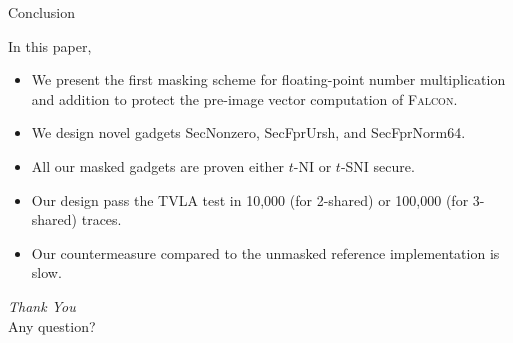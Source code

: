 \begin{frame}{Conclusion}

In this paper,
\pause
\begin{itemize}
	\item We present the first masking scheme for floating-point number multiplication and addition to protect the pre-image vector computation of \textsc{Falcon}.
	\pause
	\item We design novel gadgets {\sf SecNonzero}, {\sf SecFprUrsh}, and {\sf SecFprNorm64}.
	\pause
	\item All our masked gadgets are proven either $t$-NI or $t$-SNI secure.
	\pause
	\item Our design pass the TVLA test in 10,000 (for 2-shared) or 100,000 (for 3-shared) traces.
	\pause
	\item Our countermeasure compared to the unmasked reference implementation is slow.
\end{itemize}


\end{frame}


\begin{frame}

  \centering \Huge
  \emph{Thank You} \\
  \vspace{15pt}
  \Large
  Any question?

\end{frame}
